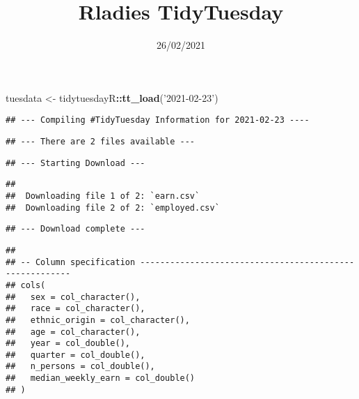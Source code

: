 \documentclass[
]{article}
\title{Rladies TidyTuesday}
\author{}
\date{\vspace{-2.5em}26/02/2021}
\newenvironment{Shaded}{\begin{snugshade}}{\end{snugshade}}
\newcommand{\KeywordTok}[1]{\textcolor[rgb]{0.13,0.29,0.53}{\textbf{#1}}}
\newcommand{\NormalTok}[1]{#1}
\newcommand{\OperatorTok}[1]{\textcolor[rgb]{0.81,0.36,0.00}{\textbf{#1}}}
\newcommand{\StringTok}[1]{\textcolor[rgb]{0.31,0.60,0.02}{#1}}
\begin{document}
\maketitle

\begin{Shaded}
\begin{Highlighting}[]
\NormalTok{tuesdata <-}\StringTok{ }\NormalTok{tidytuesdayR}\OperatorTok{::}\KeywordTok{tt_load}\NormalTok{(}\StringTok{'2021-02-23'}\NormalTok{)}
\end{Highlighting}
\end{Shaded}

\begin{verbatim}
## --- Compiling #TidyTuesday Information for 2021-02-23 ----
\end{verbatim}

\begin{verbatim}
## --- There are 2 files available ---
\end{verbatim}

\begin{verbatim}
## --- Starting Download ---
\end{verbatim}

\begin{verbatim}
## 
##  Downloading file 1 of 2: `earn.csv`
##  Downloading file 2 of 2: `employed.csv`
\end{verbatim}

\begin{verbatim}
## --- Download complete ---
\end{verbatim}

\begin{Shaded}
\end{Shaded}

\begin{verbatim}
## 
## -- Column specification --------------------------------------------------------
## cols(
##   sex = col_character(),
##   race = col_character(),
##   ethnic_origin = col_character(),
##   age = col_character(),
##   year = col_double(),
##   quarter = col_double(),
##   n_persons = col_double(),
##   median_weekly_earn = col_double()
## )
\end{verbatim}
\end{document}
